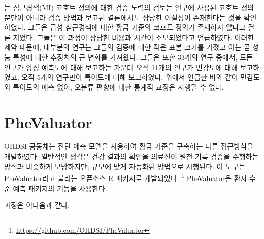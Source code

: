 \documentclass[11pt]{book}
\let\rmarkdownfootnote\footnote%
\def\footnote{\protect\rmarkdownfootnote}
\theoremstyle{definition}
\theoremstyle{definition}
\theoremstyle{definition}
\theoremstyle{remark}
\begin{document}
\citet{Rubbo2015phenotypes} 는 심근경색(MI) 코호트 정의에 대한 검증
노력의 검토는 연구에 사용된 코호트 정의뿐만이 아니라 검증 방법과 보고된
결론에서도 상당한 이질성이 존재한다는 것을 확인하였다. 그들은 급성
심근경색에 대한 황금 기준의 코호트 정의가 존재하지 않다고 결론 지었다.
그들은 이 과정이 상당한 비용과 시간이 소모되었다고 언급하였다. 이러한
제약 때문에, 대부분의 연구는 그들의 검증에 대한 작은 표본 크기를 가졌고
이는 곧 성능 특성에 대한 추정치의 큰 변화를 가져왔다. 그들은 또한 33개의
연구 중에서, 모든 연구가 양성 예측도에 대해 보고하는 가운데 오직 11개의
연구가 민감도에 대해 보고하였고, 오직 5개의 연구만이 특이도에 대해
보고하였다. 위에서 언급한 바와 같이 민감도와 특이도의 예측 없이, 오분류
편향에 대한 통계적 교정은 시행될 수 없다.

\section{PheValuator}\label{phevaluator}


OHDSI 공동체는 진단 예측 모델을 사용하여 황금 기준을 구축하는 다른
접근방식을 개발하였다. \citep{Swerdel2019phevaluator} 일반적인 생각은
건강 결과의 확인을 의료진이 원천 기록 검증을 수행하는 방식과 비슷하게
모방하지만, 규모에 맞게 자동화된 방법으로 시행된다. 이 도구는
PheValuator라고 불리는 오픈소스 R 패키지로 개발되었다. \footnote{\url{https://github.com/OHDSI/PheValuator}}
PheValuator은 환자 수준 예측 패키지의 기능을 사용한다.

과정은 이다음과 같다:
\end{document}
